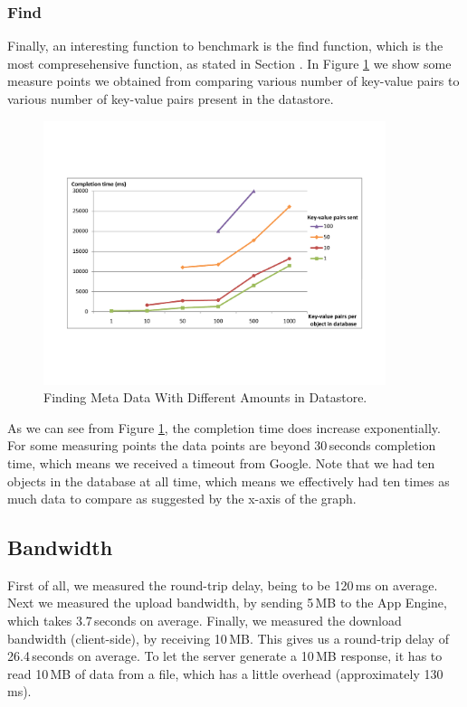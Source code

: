 \subsubsection{Find}
Finally, an interesting function to benchmark is the find function, which is the
most compresehensive function, as stated in Section \label{serverimpl-find}. In
Figure \ref{find-md-amt} we show some measure points we obtained from comparing
various number of key-value pairs to various number of key-value pairs present in
the datastore.

\begin{figure} %
\begin{center}
\includegraphics[trim=5cm 4cm 5cm 5cm,width=10cm]{./figures/find_amt.pdf}
\caption{Finding Meta Data With Different Amounts in Datastore.
\label{find-md-amt}}
\end{center}
\end{figure}

As we can see from Figure \ref{find-md-amt}, the completion time does increase
exponentially. For some measuring points the data points are beyond 30\,seconds
completion time, which means we received a timeout from Google. Note that we had
ten objects in the database at all time, which means we effectively had ten times
as much data to compare as suggested by the x-axis of the graph.

\subsection{Bandwidth}
First of all, we measured the round-trip delay, being to be 120\,ms on average.
Next we measured the upload bandwidth, by sending 5\,MB to the App Engine, which
takes 3.7\,seconds on average. Finally, we measured the download bandwidth
(client-side), by receiving 10\,MB. This gives us a round-trip delay of
26.4\,seconds on average. To let the server generate a 10\,MB response, it has to
read 10\,MB of data from a file, which has a little overhead (approximately
130\,ms).
 
